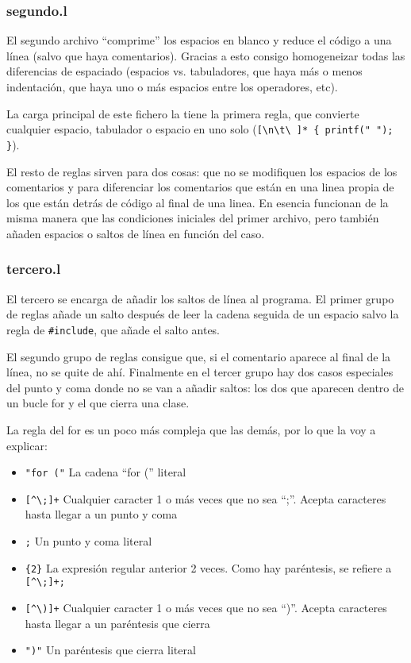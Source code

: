 \documentclass[10pt]{article}
\begin{document}
    \subsubsection{segundo.l}
    El segundo archivo ``comprime'' los espacios en blanco y reduce el código a una línea (salvo que haya comentarios). Gracias a esto consigo homogeneizar todas las diferencias de espaciado (espacios vs. tabuladores, que haya más o menos indentación, que haya uno o más espacios entre los operadores, etc).

    La carga principal de este fichero la tiene la primera regla, que convierte cualquier espacio, tabulador o espacio en uno solo (\verb|[\n\t\ ]* { printf(" "); }|).

    El resto de reglas sirven para dos cosas: que no se modifiquen los espacios de los comentarios y para diferenciar los comentarios que están en una linea propia de los que están detrás de código al final de una linea. En esencia funcionan de la misma manera que las condiciones iniciales del primer archivo, pero también añaden espacios o saltos de línea en función del caso.

    \subsubsection{tercero.l}

    El tercero se encarga de añadir los saltos de línea al programa. El primer grupo de reglas añade un salto después de leer la cadena seguida de un espacio salvo la regla de \verb|#include|, que añade el salto antes.

    El segundo grupo de reglas consigue que, si el comentario aparece al final de la línea, no se quite de ahí. Finalmente en el tercer grupo hay dos casos especiales del punto y coma donde no se van a añadir saltos: los dos que aparecen dentro de un bucle for y el que cierra una clase.

    La regla del for es un poco más compleja que las demás, por lo que la voy a explicar:

    \begin{itemize}
        \item \verb|"for ("| La cadena ``for ('' literal
        \item \verb|[^\;]+| Cualquier caracter 1 o más veces que no sea ``;''. Acepta caracteres hasta llegar a un punto y coma
        \item \verb|;| Un punto y coma literal
        \item \verb|{2}| La expresión regular anterior 2 veces. Como hay paréntesis, se refiere a \verb|[^\;]+;|
        \item \verb|[^\)]+| Cualquier caracter 1 o más veces que no sea ``)''. Acepta caracteres hasta llegar a un paréntesis que cierra
        \item \verb|")"| Un paréntesis que cierra literal
    \end{itemize}
\end{document}
